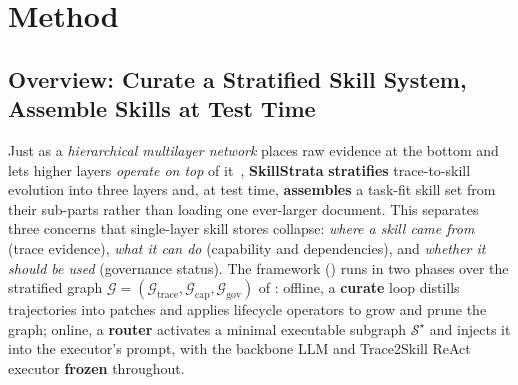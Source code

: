 \section{Method}
\label{sec:method}

\subsection{Overview: Curate a Stratified Skill System, Assemble Skills at Test Time}
\label{sec:m0}

Just as a \emph{hierarchical multilayer network} places raw evidence at the bottom and lets higher layers \emph{operate on top} of it~\citep{boccaletti2014multilayer}, \textbf{SkillStrata} \textbf{stratifies} trace-to-skill evolution into three layers and, at test time, \textbf{assembles} a task-fit skill set from their sub-parts rather than loading one ever-larger document.
This separates three concerns that single-layer skill stores collapse: \emph{where a skill came from} (trace evidence), \emph{what it can do} (capability and dependencies), and \emph{whether it should be used} (governance status).
The framework () %
runs in two phases over the stratified graph $\mathcal{G}=(\mathcal{G}_{\text{trace}},\mathcal{G}_{\text{cap}},\mathcal{G}_{\text{gov}})$ of : offline, a \textbf{curate} loop distills trajectories into patches and applies lifecycle operators to grow and prune the graph; online, a \textbf{router} activates a minimal executable subgraph $\mathcal{S}^\star$ and injects it into the executor's prompt, with the backbone LLM and Trace2Skill ReAct executor \textbf{frozen} throughout.


